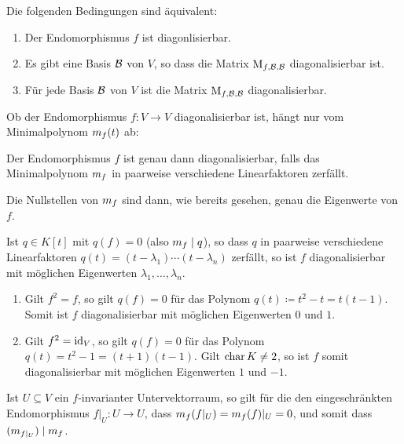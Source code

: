 \begin{lemma}
  Die folgenden Bedingungen sind äquivalent:
  \begin{enumerate}
    \item
      Der Endomorphismus $f$ ist diagonlisierbar.
    \item
      Es gibt eine Basis $\mathcal{B}$ von $V$, so dass die Matrix $\operatorname{M}_{f, \mathcal{B}, \mathcal{B}}$ diagonalisierbar ist.
    \item
      Für jede Basis $\mathcal{B}$ von $V$ ist die Matrix $\operatorname{M}_{f, \mathcal{B}, \mathcal{B}}$ diagonalisierbar.
  \end{enumerate}
\end{lemma}

Ob der Endomorphismus $f \colon V \to V$ diagonalisierbar ist, hängt nur vom Minimalpolynom $m_{f}(t)$ ab:

\begin{proposition}
  Der Endomorphismus $f$ ist genau dann diagonalisierbar, falls das Minimalpolynom $m_{f}$ in paarweise verschiedene Linearfaktoren zerfällt.
\end{proposition}

Die Nullstellen von $m_{f}$ sind dann, wie bereits gesehen, genau die Eigenwerte von $f$.

\begin{corollary}
  Ist $q \in K[t]$ mit $q(f) = 0$ \textup(also $m_f \mid q$\textup), so dass $q$ in paarweise verschiedene Linearfaktoren $q(t) = (t - \lambda_1) \dotsm (t - \lambda_n)$ zerfällt, so ist $f$ diagonalisierbar mit möglichen Eigenwerten $\lambda_1, \dotsc, \lambda_n$.
\end{corollary}

\begin{example}
  \leavevmode
  \begin{enumerate}
    \item
      Gilt $f^2 = f$, so gilt $q(f) = 0$ für das Polynom $q(t) \coloneqq t^2 - t = t(t-1)$.
      Somit ist $f$ diagonalisierbar mit möglichen Eigenwerten $0$ und $1$.
    \item
      Gilt $f^2 = \operatorname{id}_V$, so gilt $q(f) = 0$ für das Polynom $q(t) = t^2 - 1 = (t+1)(t-1)$.
      Gilt $\operatorname{char} K \neq 2$, so ist $f$ somit diagonalisierbar mit möglichen Eigenwerten $1$ und $-1$.
  \end{enumerate}
\end{example}

Ist $U \subseteq V$ ein $f$-invarianter Untervektorraum, so gilt für die den eingeschränkten Endomorphismus $f|_U \colon U \to U$, dass $m_{f}(f|_U) = m_{f}(f)|_U = 0$, und somit dass $(m_{f|_U}) \mid m_{f}$.

